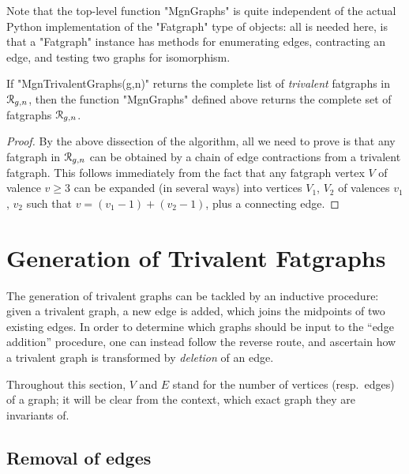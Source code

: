 Note that the top-level function "MgnGraphs" is quite independent of
the actual Python implementation of the "Fatgraph" type of objects:
all is needed here, is that a "Fatgraph" instance has methods for
enumerating edges, contracting an edge, and testing two graphs for
isomorphism.

\begin{lemma}
  If "MgnTrivalentGraphs(g,n)" returns the complete list of
  \emph{trivalent} fatgraphs in $\mathcal{R}_{g,n}$, then the function
  "MgnGraphs" defined above returns the complete set of fatgraphs
  $\mathcal{R}_{g,n}$.
\end{lemma}
\begin{proof}
  By the above dissection of the algorithm, all we need to prove is
  that any fatgraph in $\mathcal{R}_{g,n}$ can be obtained by a chain of edge
  contractions from a trivalent fatgraph.  This follows immediately
  from the fact that any fatgraph vertex $V$ of valence $v \geq 3$ can
  be expanded (in several ways) into vertices $V_1$, $V_2$ of valences
  $v_1$, $v_2$ such that $v = (v_1 -1) + (v_2 -1)$, plus a connecting
  edge.
\end{proof}


\section{Generation of Trivalent Fatgraphs}
\label{sec:trivalent}

The generation of trivalent graphs can be tackled by an inductive
procedure: given a trivalent graph, a new edge is added, which joins
the midpoints of two existing edges.  
In order to determine which graphs should be input to the ``edge
addition'' procedure, one can instead follow the reverse route, and
ascertain how a trivalent graph is transformed by \emph{deletion} of
an edge.

Throughout this section, $V$ and $E$ stand for the number of vertices
(resp.~edges) of a graph; it will be clear from the context, which
exact graph they are invariants of.

\subsection{Removal of edges}
\label{sec:removal}


